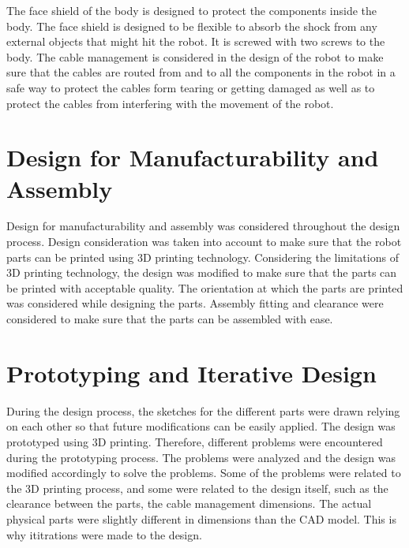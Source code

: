 The face shield of the body is designed to protect the components inside the body.
The face shield is designed to be flexible to absorb the shock from any external objects that might hit the robot. It is screwed with two screws to the body.
The cable management is considered in the design of the robot to make sure that the cables are routed from and to all the components in the robot in a safe way to protect the cables form tearing or getting damaged as well as to protect the cables from interfering with the movement of the robot.



\section{Design for Manufacturability and Assembly}
Design for manufacturability and assembly was considered throughout the design process.
Design consideration was taken into account to make sure that the robot parts can be printed using 3D printing technology.
Considering the limitations of 3D printing technology, the design was modified to make sure that the parts can be printed with acceptable quality.
The orientation at which the parts are printed was considered while designing the parts.
Assembly fitting and clearance were considered to make sure that the parts can be assembled with ease.
\newpage
\section{Prototyping and Iterative Design}

During the design process, the sketches for the different parts were drawn relying on each other so that future modifications can be easily applied.
 The design was prototyped using 3D printing.
Therefore, different problems were encountered during the prototyping process.
The problems were analyzed and the design was modified accordingly to solve the problems.
Some of the problems were related to the 3D printing process, and some were related to the design itself, such as the clearance between the parts, the cable management dimensions.
The actual physical parts were slightly different in dimensions than the CAD model.
This is why ititrations were made to the design.

